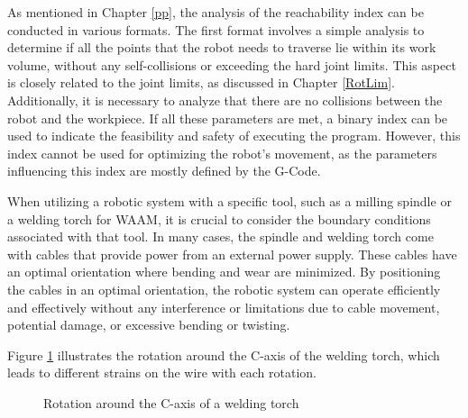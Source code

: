 As mentioned in Chapter \ref{pp}, the analysis of the reachability index can be conducted in various formats. The first format involves a simple analysis to determine if all the points that the robot needs to traverse lie within its work volume, without any self-collisions or exceeding the hard joint limits. This aspect is closely related to the joint limits, as discussed in Chapter \ref{RotLim}. Additionally, it is necessary to analyze that there are no collisions between the robot and the workpiece. If all these parameters are met, a binary index can be used to indicate the feasibility and safety of executing the program. However, this index cannot be used for optimizing the robot's movement, as the parameters influencing this index are mostly defined by the G-Code.

When utilizing a robotic system with a specific tool, such as a milling spindle or a welding torch for WAAM, it is crucial to consider the boundary conditions associated with that tool. In many cases, the spindle and welding torch come with cables that provide power from an external power supply. These cables have an optimal orientation where bending and wear are minimized. By positioning the cables in an optimal orientation, the robotic system can operate efficiently and effectively without any interference or limitations due to cable movement, potential damage, or excessive bending or twisting.

Figure \ref{rot} illustrates the rotation around the C-axis of the welding torch, which leads to different strains on the wire with each rotation.

\begin{figure}[H]%
	\centering
	\qquad
	\caption{Rotation around the C-axis of a welding torch }%
	\label{rot}%
\end{figure}
 
